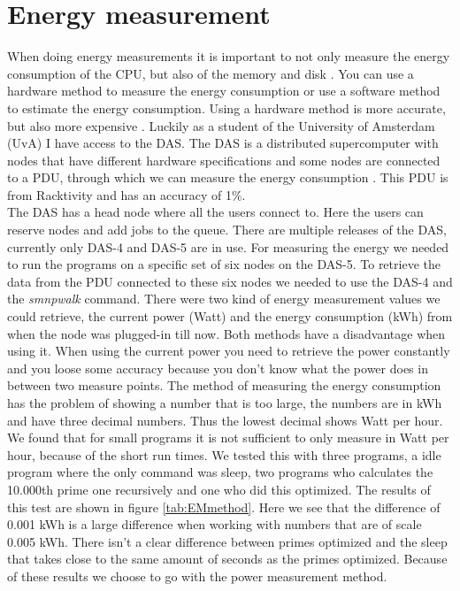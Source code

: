 \chapter{Energy measurement}
\label{ch:energy_measurement}



When doing energy measurements it is important to not only measure the energy consumption of the CPU, but also of the memory and disk \cite{acar2016impact}. You can use a hardware method to measure the energy consumption or use a software method to estimate the energy consumption. Using a hardware method is more accurate, but also more expensive \cite{acar2016impact}. Luckily as a student of the University of Amsterdam (UvA) I have access to the DAS. The DAS is a distributed supercomputer with nodes that have different hardware specifications and some nodes are connected to a PDU, through which we can measure the energy consumption \cite{bal2016medium}. This PDU is from Racktivity and has an accuracy of 1\%.\\

The DAS has a head node where all the users connect to. Here the users can reserve nodes and add jobs to the queue. There are multiple releases of the DAS, currently only DAS-4 and DAS-5 are in use. For measuring the energy we needed to run the programs on a specific set of six nodes on the DAS-5. To retrieve the data from the PDU connected to these six nodes we needed to use the DAS-4 and the \textit{smnpwalk} command. There were two kind of energy measurement values we could retrieve, the current power (Watt) and the energy consumption (kWh) from when the node was plugged-in till now. Both methods have a disadvantage when using it. When using the current power you need to retrieve the power constantly and you loose some accuracy because you don't know what the power does in between two measure points. The method of measuring the energy consumption has the problem of showing a number that is too large, the numbers are in kWh and have three decimal numbers. Thus the lowest decimal shows Watt per hour. We found that for small programs it is not sufficient to only measure in Watt per hour, because of the short run times. We tested this with three programs, a idle program where the only command was sleep, two programs who calculates the 10.000th prime one recursively and one who did this optimized. The results of this test are shown in figure \ref{tab:EMmethod}. Here we see that the difference of 0.001 kWh is a large difference when working with numbers that are of scale 0.005 kWh. There isn't a clear difference between primes optimized and the sleep that takes close to the same amount of seconds as the primes optimized. Because of these results we choose to go with the power measurement method.\\

